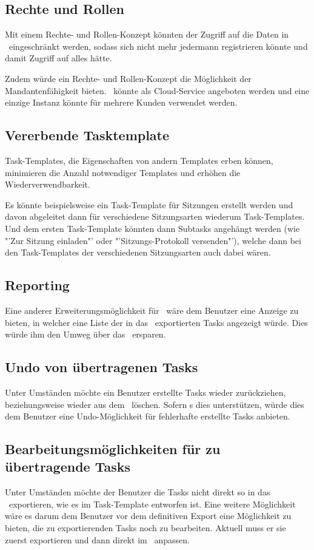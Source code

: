 		\subsection{Rechte und Rollen}
			Mit einem Rechte- und Rollen-Konzept könnten der Zugriff auf die Daten in \eeppi\ eingeschränkt werden,
			sodass sich nicht mehr jedermann registrieren könnte und damit Zugriff auf alles hätte.
			
			Zudem würde ein Rechte- und Rollen-Konzept die Möglichkeit der Mandantenfähigkeit bieten.
			\eeppi\ könnte als Cloud-Service angeboten werden und eine einzige Instanz könnte für mehrere Kunden verwendet werden.
			
		
		\subsection{Vererbende Tasktemplate}
			Task-Templates, die Eigenschaften von andern Templates erben können, 
			minimieren die Anzahl notwendiger Templates und erhöhen die Wiederverwendbarkeit.
			
			Es könnte beispielsweise ein Task-Template für Sitzungen erstellt werden
			und davon abgeleitet dann für verschiedene Sitzungsarten wiederum Task-Templates.
			Und dem ersten Task-Template könnten dann Subtasks angehängt werden
			(wie "'Zur Sitzung einladen"' oder "'Sitzungs-Protokoll versenden"'),
			welche dann bei den Task-Templates der verschiedenen Sitzungsarten auch dabei wären.
			
		
		\subsection{Reporting}
			Eine anderer Erweiterungsmöglichkeit für \eeppi\ wäre dem Benutzer eine Anzeige zu bieten,
			in welcher eine Liste der in das \ppt\ exportierten Tasks angezeigt würde.
			Dies würde ihm den Umweg über das \ppt\ ersparen.
		
		
		\subsection{Undo von übertragenen Tasks}
			Unter Umständen möchte ein Benutzer erstellte Tasks wieder zurückziehen,
			beziehungsweise wieder aus dem \ppt\ löschen.
			Sofern \ppt s dies unterstützen, würde dies dem Benutzer eine Undo-Möglichkeit für fehlerhafte erstellte Tasks anbieten.
		
		
		\subsection{Bearbeitungsmöglichkeiten für zu übertragende Tasks}
			Unter Umständen möchte der Benutzer die Tasks nicht direkt so in das \ppt\ exportieren,
			wie es im Task-Template entworfen ist.
			Eine weitere Möglichkeit wäre es darum dem Benutzer vor dem definitiven Export eine Möglichkeit zu bieten,
			die zu exportierenden Tasks noch zu bearbeiten.
			Aktuell muss er sie zuerst exportieren und dann direkt im \ppt\ anpassen.
			
